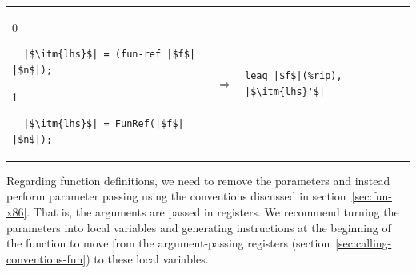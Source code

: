 \documentclass[7x10]{TimesAPriori_MIT}%
\def\racketEd{0}
\def\pythonEd{1}
\def\edition{1}
\newcommand{\pythonColor}[0]{}
\numberwithin{theorem}{chapter}
\numberwithin{definition}{chapter}
\numberwithin{equation}{chapter}
\begin{document}
\begin{center}
  \begin{tabular}{lcl}
\begin{minipage}{0.35\textwidth}
{\if\edition\racketEd
\begin{lstlisting}
  |$\itm{lhs}$| = (fun-ref |$f$| |$n$|);
\end{lstlisting}
\fi}
{\if\edition\pythonEd\pythonColor
\begin{lstlisting}
  |$\itm{lhs}$| = FunRef(|$f$| |$n$|);
\end{lstlisting}
\fi}
\end{minipage}
&
$\Rightarrow$\qquad\qquad
&
\begin{minipage}{0.3\textwidth}
\begin{lstlisting}
leaq |$f$|(%rip), |$\itm{lhs}'$|
\end{lstlisting}
\end{minipage}
  \end{tabular}
\end{center}


Regarding function definitions, we need to remove the parameters and
instead perform parameter passing using the conventions discussed in
section~\ref{sec:fun-x86}. That is, the arguments are passed in
registers. We recommend turning the parameters into local variables
and generating instructions at the beginning of the function to move
from the argument-passing registers
(section~\ref{sec:calling-conventions-fun}) to these local variables.
\end{document}
